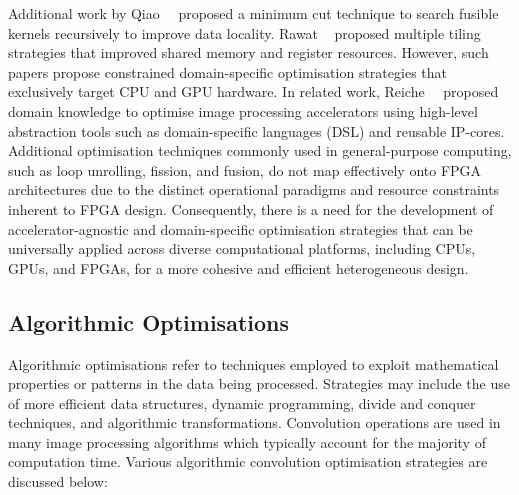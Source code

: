 Additional work by Qiao~\etal~\cite{QiaReiOli19} proposed a minimum cut technique to search fusible kernels recursively to improve data locality. Rawat \etal~\cite{RawPraVad} proposed multiple tiling strategies that improved shared memory and register resources. However, such papers propose constrained domain-specific optimisation strategies that exclusively target CPU and GPU hardware. In related work, Reiche~\etal~\cite{ReiKonMar15} proposed domain knowledge to optimise image processing accelerators using high-level abstraction tools such as domain-specific languages (DSL) and reusable IP-cores. Additional optimisation techniques commonly used in general-purpose computing, such as loop unrolling, fission, and fusion, do not map effectively onto FPGA architectures due to the distinct operational paradigms and resource constraints inherent to FPGA design. Consequently, there is a need for the development of accelerator-agnostic and domain-specific optimisation strategies that can be universally applied across diverse computational platforms, including CPUs, GPUs, and FPGAs, for a more cohesive and efficient heterogeneous design.



\subsection*{Algorithmic Optimisations}
Algorithmic optimisations refer to techniques employed to exploit mathematical properties or patterns in the data being processed. Strategies may include the use of more efficient data structures, dynamic programming, divide and conquer techniques, and algorithmic transformations. Convolution operations are used in many image processing algorithms which typically account for the majority of computation time. Various algorithmic convolution optimisation strategies are discussed below:

